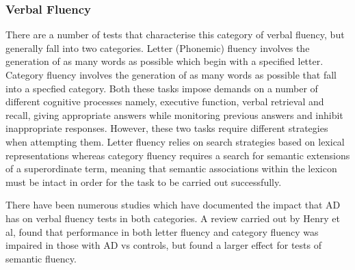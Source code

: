 \documentclass[12pt, twoside, a4paper]{article}
\begin{document}
\subsubsection{Verbal Fluency}
There are a number of tests that characterise this category of verbal fluency, but generally fall into two categories. Letter (Phonemic) fluency involves the generation of as many words as possible which begin with a specified letter. Category fluency involves the generation of as many words as possible that fall into a specfied category. Both these tasks impose demands on a number of different cognitive processes namely, executive function, verbal retrieval and recall, giving appropriate answers while monitoring previous answers and inhibit inappropriate responses. However, these two tasks require different strategies when attempting them. Letter fluency relies on search strategies based on lexical representations whereas category fluency requires a search for semantic extensions of a superordinate term, meaning that semantic associations within the lexicon must be intact in order for the task to be carried out successfully. \par  
There have been numerous studies which have documented the impact that AD has on verbal fluency tests in both categories. A review carried out by Henry et al, found that performance in both letter fluency and category fluency was impaired in those with AD vs controls, but found a larger effect for tests of semantic fluency.
\end{document}
